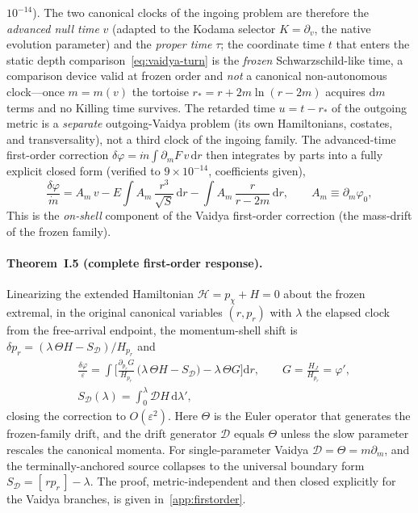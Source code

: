 \documentclass[12pt]{iopart}
\newcommand{\dd}{\mathrm{d}}
\begin{document}
$10^{-14}$). The two canonical clocks of the ingoing problem are therefore the
\emph{advanced null time} $v$ (adapted to the Kodama selector $K=\partial_v$, the
native evolution parameter) and the \emph{proper time} $\tau$; the coordinate time
$t$ that enters the static depth comparison~\eqref{eq:vaidya-turn} is the
\emph{frozen} Schwarzschild-like time, a comparison device valid at frozen order and
\emph{not} a canonical non-autonomous clock---once $m=m(v)$ the tortoise
$r_*=r+2m\ln(r-2m)$ acquires $\dd m$ terms and no Killing time survives. The retarded
time $u=t-r_*$ of the outgoing metric is a \emph{separate} outgoing-Vaidya problem
(its own Hamiltonians, costates, and transversality), not a third clock of the ingoing
family. The advanced-time first-order correction
$\delta\varphi=\dot m\!\int\!\partial_m F\,v\,\dd r$ then integrates by parts into a
fully explicit closed form (verified to $9\times10^{-14}$, coefficients given),
\begin{equation}
    \frac{\delta\varphi}{\dot m}
    =A_m\,v-E\!\int\! A_m\,\frac{r^3}{\sqrt S}\,\dd r
    -\int\! A_m\,\frac{r}{r-2m}\,\dd r,\qquad A_m\equiv\partial_m\varphi_0,
    \label{eq:vaidya-deltaphi}
\end{equation}
This is the \emph{on-shell} component of the Vaidya first-order correction (the
mass-drift of the frozen family).

\paragraph{Theorem~I.5 (complete first-order response).} Linearizing the extended
Hamiltonian $\mathcal H=p_\chi+H=0$ about the frozen extremal, in the original canonical
variables $(r,p_r)$ with $\lambda$ the elapsed clock from the free-arrival endpoint, the
momentum-shell shift is $\delta p_r=(\lambda\,\Theta H-S_{\mathcal D})/H_{p_r}$ and
\begin{equation}
    \begin{aligned}
    &\frac{\delta\varphi}{\varepsilon}=\int\!\Big[\frac{\partial_{p_r}G}{H_{p_r}}\,
    \big(\lambda\,\Theta H-S_{\mathcal D}\big)-\lambda\,\Theta G\Big]\dd r,\qquad
    G=\frac{H_J}{H_{p_r}}=\varphi',\\[2pt]
    &S_{\mathcal D}(\lambda)=\!\int_0^{\lambda}\!\mathcal D H\,\dd\lambda',
    \end{aligned}
    \label{eq:adiab-exact}
\end{equation}
closing the correction to $O(\varepsilon^2)$. Here $\Theta$ is the Euler operator that
generates the frozen-family drift, and the drift generator $\mathcal D$ equals $\Theta$
unless the slow parameter rescales the canonical momenta. For single-parameter Vaidya
$\mathcal D=\Theta=m\partial_m$, and the terminally-anchored source collapses to the
universal boundary form $S_{\mathcal D}=[\,rp_r\,]-\lambda$. The proof, metric-independent
and then closed explicitly for the Vaidya branches, is given in~\ref{app:firstorder}.
\end{document}
